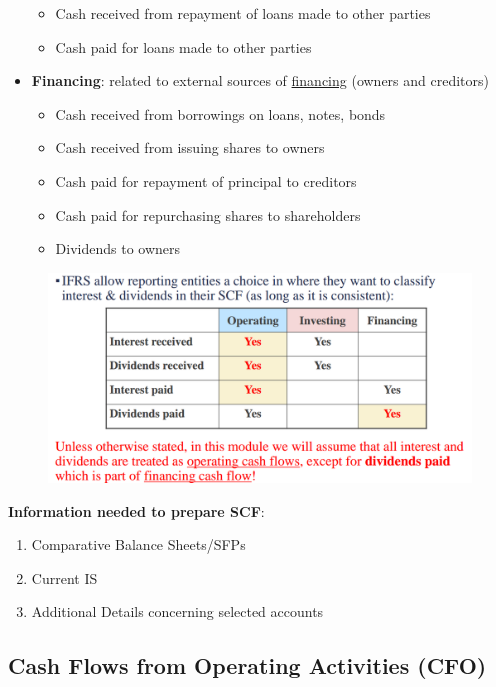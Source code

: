 \documentclass{article}
\begin{document}
\begin{multicols}{2}
\begin{itemize}
\begin{itemize}
		\item Cash received from repayment of loans made to other parties
		\item Cash paid for loans made to other parties
	\end{itemize}
	\item \textbf{Financing}: related to external sources of \underline{financing} (owners and creditors)
	\begin{itemize}
		\item Cash received from borrowings on loans, notes, bonds
		\item Cash received from issuing shares to owners
		\item Cash paid for repayment of principal to creditors
		\item Cash paid for repurchasing shares to shareholders
		\item Dividends to owners
	\end{itemize}
\end{itemize}
\begin{figure}[H]
	\centering
	\includegraphics[width=\columnwidth]{image/intdiv.png}
\end{figure}
\textbf{Information needed to prepare SCF}:
\begin{enumerate}
	\item Comparative Balance Sheets/SFPs
	\item Current IS
	\item Additional Details concerning selected accounts
\end{enumerate}
\subsection{Cash Flows from Operating Activities (CFO)}




\end{multicols}
\end{document}
